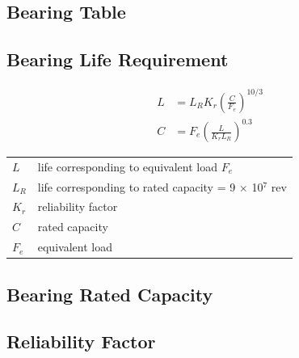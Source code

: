 \documentclass[
10pt,
a4paper,
openany,
svgnames,
]{book}
\begin{document}
\subsection*{Bearing Table}
\label{sec:org54e4707}

\begin{center}
\end{center}

\subsection*{Bearing Life Requirement}
\label{sec:org689594f}

\begin{align*}
    L &= L_R K_r \left( \frac{C}{F_e} \right)^{10/3} \\
    C &= F_e \left( \frac{L}{K_r L_R} \right)^{0.3}
\end{align*}

\begin{center}
\begin{tabular}{ll}
\(L\) & life corresponding to equivalent load \(F_e\)\\
\(L_R\) & life corresponding to rated capacity = 9 \(\times\) 10\(^7\) rev\\
\(K_r\) & reliability factor\\
\(C\) & rated capacity\\
\(F_e\) & equivalent load\\
\end{tabular}
\end{center}

\subsection*{Bearing Rated Capacity}
\label{sec:org59f1f39}

\begin{center}
\end{center}

\subsection*{Reliability Factor}
\label{sec:org8b329d7}

\begin{center}
\end{center}
\end{document}
